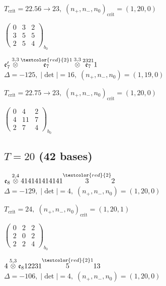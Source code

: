 \documentclass[10pt]{article}
\begin{document}
\hspace{1em}$T_{\text{crit}}=22.56 \to 23,\; (n_+,n_-,n_0)_{\text{crit}}=(1,20,0)$

\hspace{2em}$\left(\begin{smallmatrix}0 & 3 & 2 \\ 3 & 5 & 5 \\ 2 & 5 & 4\end{smallmatrix}\right)_{\!b_0}$

$\mathfrak{e}_7'\overset{3,3}{\otimes}\overset{\textcolor{red}{2}1}{\mathfrak{e}_7}\overset{3,3}{\otimes}\overset{2321}{\mathfrak{e}_7}1$ \quad $\Delta=-125,\; |\det|=16,\; (n_+,n_-,n_0)=(1,19,0)$

\hspace{1em}$T_{\text{crit}}=22.75 \to 23,\; (n_+,n_-,n_0)_{\text{crit}}=(1,20,0)$

\hspace{2em}$\left(\begin{smallmatrix}0 & 4 & 2 \\ 4 & 11 & 7 \\ 2 & 7 & 4\end{smallmatrix}\right)_{\!b_0}$


\subsection*{$T = 20$ \quad (42 bases)}
\smallskip

$\mathfrak{e}_8\overset{2,4}{\otimes}414141414141\overset{\textcolor{red}{2}}{3}2$ \quad $\Delta=-129,\; |\det|=4,\; (n_+,n_-,n_0)=(1,20,0)$

\hspace{1em}$T_{\text{crit}}=24,\; (n_+,n_-,n_0)_{\text{crit}}=(1,20,1)$

\hspace{2em}$\left(\begin{smallmatrix}0 & 2 & 2 \\ 2 & 0 & 2 \\ 2 & 2 & 4\end{smallmatrix}\right)_{\!b_0}$

\smallskip

$4\overset{5,3}{\otimes}\mathfrak{e}_812231\overset{\textcolor{red}{2}1}{5}13$ \quad $\Delta=-106,\; |\det|=4,\; (n_+,n_-,n_0)=(1,20,0)$
\end{document}

